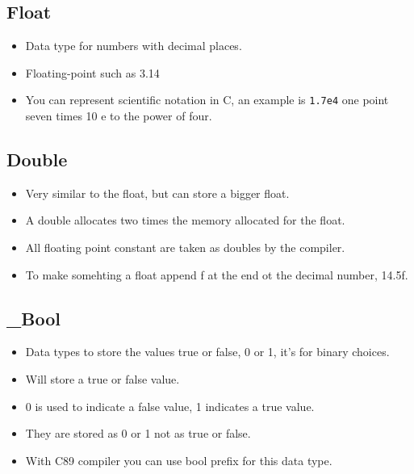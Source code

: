 \subsection{Float}
\begin{itemize}
    \item Data type for numbers with decimal places.
    \item Floating-point such as 3.14
    \item You can represent scientific notation in C, an example is \verb|1.7e4| one point seven times 10 e to the power of four.
\end{itemize}
\subsection{Double}
\begin{itemize}
    \item Very similar to the float, but can store a bigger float.
    \item A double allocates two times the memory allocated for the float.
    \item All floating point constant are taken as doubles by the compiler.
    \item To make somehting a float append f at the end ot the decimal number, 14.5f.
\end{itemize}
\subsection{\_Bool}
\begin{itemize}
    \item Data types to store the values true or false, 0 or 1, it's for binary choices.
    \item Will store a true or false value.
    \item 0 is used to indicate a false value, 1 indicates a true value.
    \item They are stored as 0 or 1 not as true or false.
    \item With C89 compiler you can use bool prefix for this data type.
\end{itemize}
